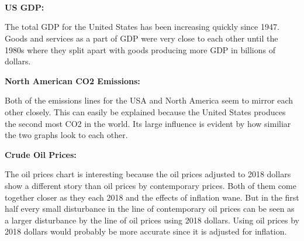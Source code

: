 \documentclass[11pt]{article}
\begin{document}
    \begin{center}
    \end{center}
    { \hspace*{\fill} \\}
    
    \begin{center}
    \end{center}
    { \hspace*{\fill} \\}
    
    \begin{center}
    \end{center}
    { \hspace*{\fill} \\}
    
    \textbf{US GDP:}

The total GDP for the United States has been increasing quickly since
1947. Goods and services as a part of GDP were very close to each other
until the 1980s where they split apart with goods producing more GDP in
billions of dollars.

\textbf{North American CO2 Emissions:}

Both of the emissions lines for the USA and North America seem to mirror
each other closely. This can easily be explained because the United
States produces the second most CO2 in the world. Its large influence is
evident by how similiar the two graphs look to each other.

\textbf{Crude Oil Prices:}

The oil prices chart is interesting because the oil prices adjusted to
2018 dollars show a different story than oil prices by contemporary
prices. Both of them come together closer as they each 2018 and the
effects of inflation wane. But in the first half every small disturbance
in the line of contemporary oil prices can be seen as a larger
disturbance by the line of oil prices using 2018 dollars. Using oil
prices by 2018 dollars would probably be more accurate since it is
adjusted for inflation.
\end{document}
